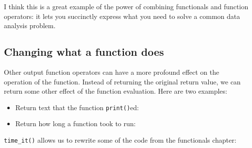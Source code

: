 I think this is a great example of the power of combining functionals
and function operators: it lets you succinctly express what you need to
solve a common data analysis problem.

\subsection{Changing what a function does}

Other output function operators can have a more profound effect on the
operation of the function. Instead of returning the original return
value, we can return some other effect of the function evaluation. Here
are two examples:

\begin{itemize}
\item
  Return text that the function \texttt{print()}ed:

\begin{Shaded}
\begin{Highlighting}[]
\StringTok{ }
    \NormalTok{(}
  \NormalTok{\}}
\NormalTok{\}}
\StringTok{ }
\NormalTok{(}\NormalTok{:}\NormalTok{)}
\NormalTok{(}\NormalTok{:}\NormalTok{)}
\end{Highlighting}
\end{Shaded}
\item
  Return how long a function took to run: 

\begin{Shaded}
\begin{Highlighting}[]
\StringTok{ }
    \NormalTok{(}
  \NormalTok{\}}
\NormalTok{\}}
\end{Highlighting}
\end{Shaded}
\end{itemize}

\texttt{time\_it()} allows us to rewrite some of the code from the
functionals chapter:

